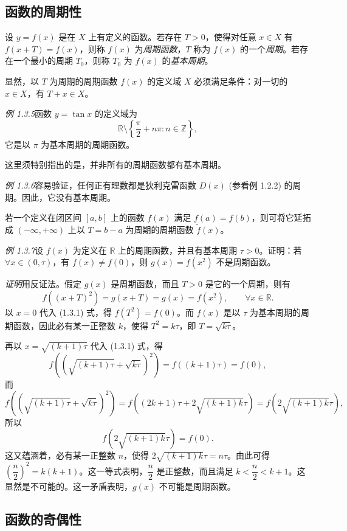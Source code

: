\documentclass[UTF8,12pt,a4paper,fontset=fandol]{ctexbook}
\begin{document}
\subsection{函数的周期性}

设 $y=f(x)$ 是在 $X$ 上有定义的函数。若存在 $T>0$，使得对任意 $x\in X$ 有 $f(x+T)=f(x)$，则称 $f(x)$ 为\emph{周期函数}，$T$ 称为 $f(x)$ 的一个\emph{周期}。若存在一个最小的周期 $T_0$，则称 $T_0$ 为 $f(x)$ 的\emph{基本周期}。

显然，以 $T$ 为周期的周期函数 $f(x)$ 的定义域 $X$ 必须满足条件：对一切的 $x\in X$，有 $T+x\in X$。

\noindent\emph{例 1.3.5}\quad 函数 $y=\tan x$ 的定义域为
\[
  \mathbb{R}\setminus\left\{\frac\pi2+n\pi:n\in\mathbb{Z}\right\},
\]
它是以 $\pi$ 为基本周期的周期函数。

这里须特别指出的是，并非所有的周期函数都有基本周期。

\noindent\emph{例 1.3.6}\quad 容易验证，任何正有理数都是狄利克雷函数 $D(x)$ (参看例 1.2.2) 的周期。因此，它没有基本周期。

若一个定义在闭区间 $[a,b]$ 上的函数 $f(x)$ 满足 $f(a)=f(b)$，则可将它延拓成 $(-\infty,+\infty)$ 上以 $T=b-a$ 为周期的周期函数 $\tilde f(x)$。

\noindent\emph{例 1.3.7}\quad 设 $f(x)$ 为定义在 $\mathbb{R}$ 上的周期函数，并且有基本周期 $\tau>0$。证明：若 $\forall x\in(0,\tau)$，有 $f(x)\ne f(0)$，则 $g(x)=f(x^2)$ 不是周期函数。

\noindent\emph{证明}\quad 用反证法。假定 $g(x)$ 是周期函数，而且 $T>0$ 是它的一个周期，则有
\begin{equation}
  f((x+T)^2)=g(x+T)=g(x)=f(x^2),\qquad \forall x\in\mathbb{R}.
  \tag{1.3.1}
\end{equation}
以 $x=0$ 代入 (1.3.1) 式，得 $f(T^2)=f(0)$。而 $f(x)$ 是以 $\tau$ 为基本周期的周期函数，因此必有某一正整数 $k$，使得 $T^2=k\tau$，即 $T=\sqrt{k\tau}$。

再以 $x=\sqrt{(k+1)\tau}$ 代入 (1.3.1) 式，得
\[
  f\left(\left(\sqrt{(k+1)\tau}+\sqrt{k\tau}\right)^2\right)=f((k+1)\tau)=f(0),
\]
而
\[
  f\left(\left(\sqrt{(k+1)\tau}+\sqrt{k\tau}\right)^2\right)
  =f\left((2k+1)\tau+2\sqrt{(k+1)k}\tau\right)
  =f(2\sqrt{(k+1)k}\tau),
\]
所以
\[
  f(2\sqrt{(k+1)k}\tau)=f(0).
\]
这又蕴涵着，必有某一正整数 $n$，使得 $2\sqrt{(k+1)k}\tau=n\tau$。由此可得 $\left(\dfrac n2\right)^2=k(k+1)$。这一等式表明，$\dfrac n2$ 是正整数，而且满足 $k<\dfrac n2<k+1$。这显然是不可能的。这一矛盾表明，$g(x)$ 不可能是周期函数。

\subsection{函数的奇偶性}
\end{document}
